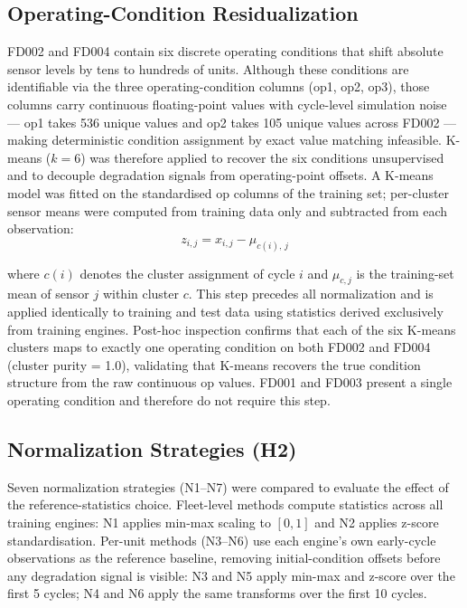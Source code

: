 \documentclass[review,12pt]{elsarticle}
\begin{document}
\subsection{Operating-Condition Residualization}

FD002 and FD004 contain six discrete operating conditions that shift absolute sensor levels by tens to hundreds of units. Although these conditions are identifiable via the three operating-condition columns (op1, op2, op3), those columns carry continuous floating-point values with cycle-level simulation noise --- op1 takes 536 unique values and op2 takes 105 unique values across FD002 --- making deterministic condition assignment by exact value matching infeasible. K-means ($k = 6$) was therefore applied to recover the six conditions unsupervised and to decouple degradation signals from operating-point offsets. A K-means model was fitted on the standardised op columns of the training set; per-cluster sensor means were computed from training data only and subtracted from each observation:
\begin{equation}
z_{i,j} = x_{i,j} - \mu_{c(i),\,j}
\end{equation}

where $c(i)$ denotes the cluster assignment of cycle $i$ and $\mu_{c,j}$ is the training-set mean of sensor $j$ within cluster $c$. This step precedes all normalization and is applied identically to training and test data using statistics derived exclusively from training engines. Post-hoc inspection confirms that each of the six K-means clusters maps to exactly one operating condition on both FD002 and FD004 (cluster purity = 1.0), validating that K-means recovers the true condition structure from the raw continuous op values. FD001 and FD003 present a single operating condition and therefore do not require this step.

\subsection{Normalization Strategies (H2)}

Seven normalization strategies (N1--N7) were compared to evaluate the effect of the reference-statistics choice. Fleet-level methods compute statistics across all training engines: N1 applies min-max scaling to $[0,1]$ and N2 applies z-score standardisation. Per-unit methods (N3--N6) use each engine's own early-cycle observations as the reference baseline, removing initial-condition offsets before any degradation signal is visible: N3 and N5 apply min-max and z-score over the first 5 cycles; N4 and N6 apply the same transforms over the first 10 cycles.
\end{document}

